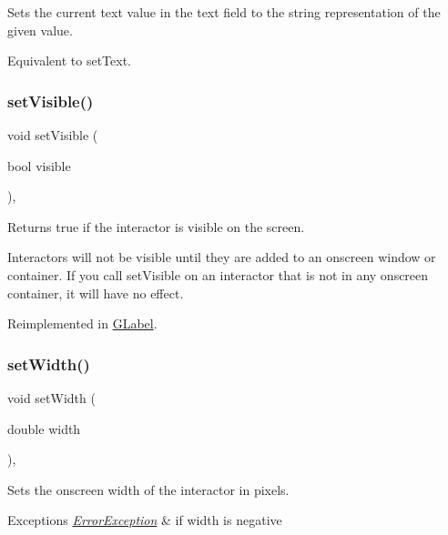 Sets the current text value in the text field to the string representation of the given value. 

Equivalent to set\+Text. \mbox{\label{classGInteractor_a18e44e30b31525a243960ca3928125aa}} 
\subsubsection{\texorpdfstring{set\+Visible()}{setVisible()}}
{\footnotesize\ttfamily void set\+Visible (\begin{DoxyParamCaption}\item[{bool}]{visible }\end{DoxyParamCaption})\hspace{0.3cm}{\ttfamily [virtual]}, {\ttfamily [inherited]}}



Returns true if the interactor is visible on the screen. 

Interactors will not be visible until they are added to an onscreen window or container. If you call set\+Visible on an interactor that is not in any onscreen container, it will have no effect. 

Reimplemented in \mbox{\hyperlink{classGLabel_a95c2a1221e6c59e9de544054963b4b18}{G\+Label}}.

\mbox{\label{classGInteractor_aa3f3fba4cb131baa8696ba01e3bceca1}} 
\subsubsection{\texorpdfstring{set\+Width()}{setWidth()}}
{\footnotesize\ttfamily void set\+Width (\begin{DoxyParamCaption}\item[{double}]{width }\end{DoxyParamCaption})\hspace{0.3cm}{\ttfamily [virtual]}, {\ttfamily [inherited]}}



Sets the onscreen width of the interactor in pixels. 


\begin{DoxyExceptions}{Exceptions}
{\em \mbox{\hyperlink{classErrorException}{Error\+Exception}}} & if width is negative \\
\hline
\end{DoxyExceptions}


